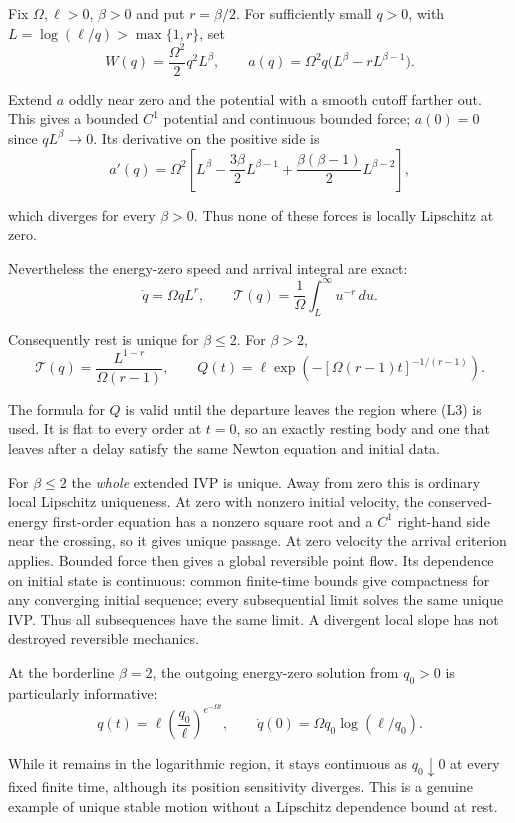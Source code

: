 \documentclass[11pt,a4paper]{article}
\begin{document}
Fix \(\Omega,\ell>0\), \(\beta>0\) and put \(r=\beta/2\). For
sufficiently small \(q>0\), with \(L=\log(\ell/q)>\max\{1,r\}\), set \[
 W(q)=\frac{\Omega^2}{2}q^2 L^\beta,\qquad
 a(q)=\Omega^2q\bigl(L^\beta-rL^{\beta-1}\bigr).
 \tag{L3}
\]

Extend \(a\) oddly near zero and the potential with a smooth cutoff
farther out. This gives a bounded \(C^1\) potential and continuous
bounded force; \(a(0)=0\) since \(q L^\beta\to0\). Its derivative on the
positive side is \[
 a'(q)=\Omega^2\left[L^\beta-\frac{3\beta}{2}L^{\beta-1}
              +\frac{\beta(\beta-1)}2L^{\beta-2}\right],
 \tag{L4}
\]

which diverges for every \(\beta>0\). Thus none of these forces is
locally Lipschitz at zero.

Nevertheless the energy-zero speed and arrival integral are exact: \[
 \dot q=\Omega qL^r,\qquad
 \mathcal T(q)=\frac1\Omega\int_L^\infty u^{-r}\,du.
 \tag{L5}
\]

Consequently rest is unique for \(\beta\le2\). For \(\beta>2\), \[
 \mathcal T(q)=\frac{L^{1-r}}{\Omega(r-1)},\qquad
 Q(t)=\ell\exp\left(-[\Omega(r-1)t]^{-1/(r-1)}\right).
 \tag{L6}
\]

The formula for \(Q\) is valid until the departure leaves the region
where (L3) is used. It is flat to every order at \(t=0\), so an exactly
resting body and one that leaves after a delay satisfy the same Newton
equation and initial data.

For \(\beta\le2\) the \emph{whole} extended IVP is unique. Away from
zero this is ordinary local Lipschitz uniqueness. At zero with nonzero
initial velocity, the conserved-energy first-order equation has a
nonzero square root and a \(C^1\) right-hand side near the crossing, so
it gives unique passage. At zero velocity the arrival criterion applies.
Bounded force then gives a global reversible point flow. Its dependence
on initial state is continuous: common finite-time bounds give
compactness for any converging initial sequence; every subsequential
limit solves the same unique IVP. Thus all subsequences have the same
limit. A divergent local slope has not destroyed reversible mechanics.

At the borderline \(\beta=2\), the outgoing energy-zero solution from
\(q_0>0\) is particularly informative: \[
 q(t)=\ell\left(\frac{q_0}{\ell}\right)^{e^{-\Omega t}},
 \qquad \dot q(0)=\Omega q_0\log(\ell/q_0).
 \tag{L7}
\]

While it remains in the logarithmic region, it stays continuous as
\(q_0\downarrow0\) at every fixed finite time, although its position
sensitivity diverges. This is a genuine example of unique stable motion
without a Lipschitz dependence bound at rest.
\end{document}
